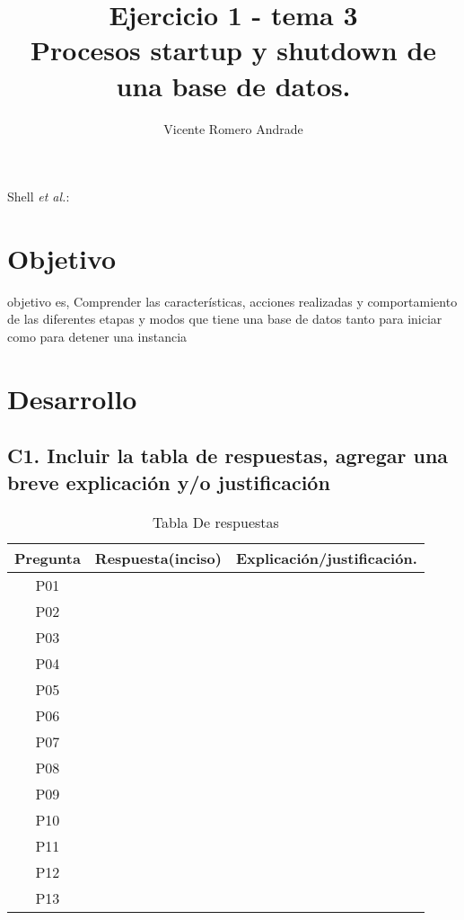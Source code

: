 \documentclass[journal]{IEEEtran}
\begin{document}
\title{Ejercicio 1 - tema 3 \\ Procesos startup y shutdown de una base de datos.}
%
\author{Vicente Romero Andrade}

%
{Shell \MakeLowercase{\textit{et al.}}: }

\maketitle


\IEEEpeerreviewmaketitle

\section{Objetivo}

 objetivo es, Comprender las características, acciones realizadas y 
comportamiento de las diferentes etapas y modos que tiene una base de datos tanto para iniciar como para detener una instancia

\section{Desarrollo}
\subsection{C1.  Incluir la tabla de respuestas, agregar una breve explicación y/o justificación}
\begin{table}[H]
  \centering
  \begin{tabular}{||c |c| c||} 
   \hline
   Pregunta & Respuesta(inciso) &Explicación/justificación.\\ [1.0ex] 
   \hline
   P01 &  &  \\ 
   P02 &  &  \\ 
   P03 &  &  \\ 
   P04 &  &  \\ 
   P05 &  &  \\ 
   P06 &  &  \\ 
   P07 &  &  \\ 
   P08 &  &  \\ 
   P09 &  &  \\ 
   P10 &  &  \\ 
   P11 &  &  \\ 
   P12 &  &  \\ 
   P13 &  &  \\  [1ex] 
   \hline
  \end{tabular}
  \caption{Tabla De respuestas}
  \label{tabla:1}
  \end{table}
\end{document}

